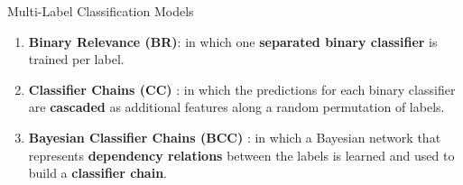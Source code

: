 \documentclass[handout]{beamer}
\begin{document}
\begin{frame}{Multi-Label Classification Models}
\begin{scriptsize}
\begin{enumerate}
\item \textbf{Binary Relevance (BR)}: in which one \textbf{separated binary classifier} is trained per label.
\item \textbf{Classifier Chains (CC)} \cite{read2011classifier}: in which the predictions for each binary classifier are \textbf{cascaded} as additional features along a random permutation of labels.
\item \textbf{Bayesian Classifier Chains (BCC)} \cite{ZaragozaSMBL11}: in which a Bayesian network that represents \textbf{dependency relations} between the labels is learned and used to build a \textbf{classifier chain}.  
\end{enumerate}
\end{scriptsize}
\end{frame}
\end{document}
